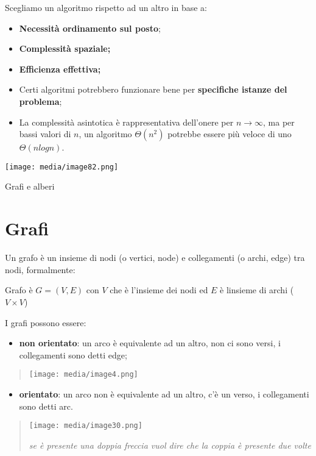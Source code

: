 Scegliamo un algoritmo rispetto ad un altro in base a:

\begin{itemize}
\item
  \textbf{Necessità ordinamento sul posto};
\item
  \textbf{Complessità spaziale;}
\item
  \textbf{Efficienza effettiva;}
\item
  Certi algoritmi potrebbero funzionare bene per \textbf{specifiche
  istanze del problema};
\item
  La complessità asintotica è rappresentativa dell'onere per
  \(n \rightarrow \infty\), ma per bassi valori di \(n\), un algoritmo
  \(\Theta(n^{2})\) potrebbe essere più veloce di uno \(\Theta(nlogn)\).
\end{itemize}

\texttt{[image: media/image82.png]}

Grafi e alberi

\section{Grafi}\label{grafi}

Un grafo è un insieme di nodi (o vertici, node) e collegamenti (o archi,
edge) tra nodi, formalmente:

Grafo è \(G = (V,E)\) con \(V\) che è l'insieme dei nodi ed \(E\) è
l\textquotesingle insieme di archi (\(V \times V\))

I grafi possono essere:

\begin{itemize}
\item
  \textbf{non orientato}: un arco è equivalente ad un altro, non ci sono
  versi, i collegamenti sono detti edge;
\end{itemize}

\begin{quote}
\texttt{[image: media/image4.png]}
\end{quote}

\begin{itemize}
\item
  \textbf{orientato}: un arco non è equivalente ad un altro, c'è un
  verso, i collegamenti sono detti arc.
\end{itemize}

\begin{quote}
\texttt{[image: media/image30.png]}

\emph{se è presente una doppia freccia vuol dire che la coppia è
presente due volte}
\end{quote}

